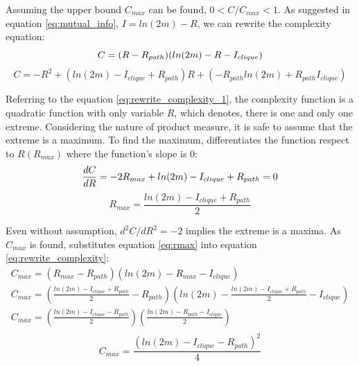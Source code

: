 \documentclass[12pt]{article}
\begin{document}
Assuming the upper bound $C_{max}$ can be found, $0<C/C_{max}<1$. As suggested in equation \ref{eq:mutual_info}, $I = ln(2m)-R$, we can rewrite the complexity equation:\\
\begin{equation}
    \label{eq:rewrite_complexity}
     C = (R-R_{path})(ln(2m)-R-I_{clique})\\
\end{equation}
\begin{equation}
    \label{eq:rewrite_complexity_1}
    C = -R^2+(ln(2m)-I_{clique}+R_{path})R+(-R_{path}ln(2m)+R_{path}I_{clique})
\end{equation}
\par
Referring to the equation \ref{eq:rewrite_complexity_1}, the complexity function is a quadratic function with only variable $R$, which denotes, there is one and only one extreme. Considering the nature of product measure, it is safe to assume that the extreme is a maximum. To find the maximum, differentiates the function respect to $R(R_{max})$ where the function's slope is 0:
\begin{equation}
    \label{eq:mari_diff}
        \frac{dC}{dR} = -2R_{max}+ln(2m)-I_{clique}+R_{path} = 0\\
\end{equation}
\begin{equation}
    \label{eq:rmax}
    R_{max} = \frac{ln(2m)-I_{clique}+R_{path}}{2}
\end{equation}
\par
Even without assumption, $d^2C/dR^2 = -2$ implies the extreme is a maxima. As $C_{max}$ is found, substitutes equation \ref{eq:rmax} into equation \ref{eq:rewrite_complexity}:\\
\begin{equation}
    \begin{gathered}
        C_{max} =(R_{max}-R_{path})(ln(2m)-R_{max}-I_{clique})\\
        C_{max} = (\frac{ln(2m)-I_{clique}+R_{path}}{2}-R_{path})(ln(2m)-\frac{ln(2m)-I_{clique}+R_{path}}{2}-I_{clique})\\
        C_{max} = (\frac{ln(2m)-I_{clique}-R_{path}}{2})(\frac{ln(2m)-R_{path}-I_{clique}}{2})\\
    \end{gathered}
\end{equation}
\begin{equation}
    \label{c_max}
    C_{max} = \frac{(ln(2m)-I_{clique}-R_{path})^2}{4}
\end{equation}
\end{document}
